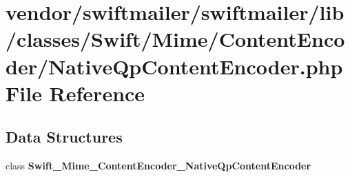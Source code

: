 \section{vendor/swiftmailer/swiftmailer/lib/classes/\+Swift/\+Mime/\+Content\+Encoder/\+Native\+Qp\+Content\+Encoder.php File Reference}
\label{_native_qp_content_encoder_8php}
\subsection*{Data Structures}
\begin{DoxyCompactItemize}
\item 
class {\bf Swift\+\_\+\+Mime\+\_\+\+Content\+Encoder\+\_\+\+Native\+Qp\+Content\+Encoder}
\end{DoxyCompactItemize}
